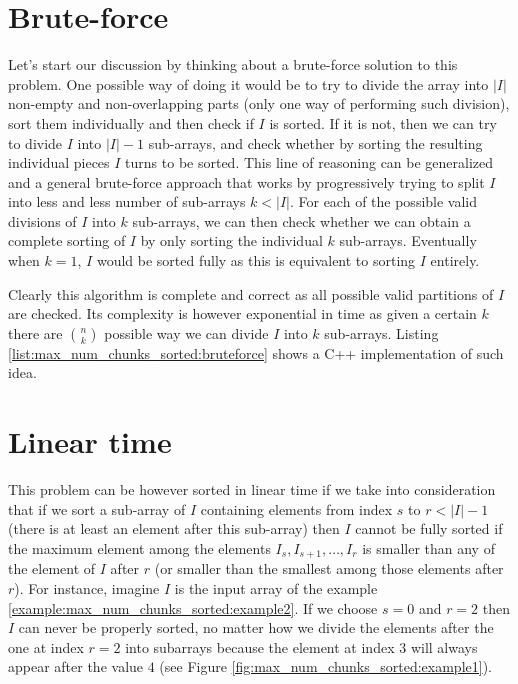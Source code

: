 \section{Brute-force}
\label{max_num_chunks_sorted:sec:bruteforce}


Let's start our discussion by thinking about a brute-force solution to this problem. 
One possible way of doing it would be to try to divide the array into $|I|$ non-empty and non-overlapping parts (only one way of performing such division), 
sort  them individually and then check if $I$ is sorted. 
If it is not, then we can try to divide $I$ into $|I|-1$ sub-arrays,
and check whether by sorting the resulting individual pieces $I$ turns to be sorted.
This line of reasoning can be generalized and a general brute-force approach
that works by progressively trying to split $I$ into less and less number of sub-arrays $k <|I|$.
For each of the possible valid divisions of $I$ into $k$ sub-arrays, we can then check whether we can obtain a complete sorting of $I$ by only sorting the individual $k$ sub-arrays.
Eventually when $k=1$, $I$ would be sorted fully as this is equivalent to sorting $I$ entirely.

Clearly this algorithm is complete and correct
as all possible valid partitions of $I$ are checked. Its complexity is however exponential
in time as given a certain $k$ there are ${n \choose k} $ possible way we can divide $I$ into $k$ sub-arrays. 
Listing \ref{list:max_num_chunks_sorted:bruteforce} shows a C++ implementation of such idea. 



    



\section{Linear time}
\label{max_num_chunks_sorted:sec:lineartime}
This problem can be however sorted in linear time if we take into consideration that if we sort a sub-array of $I$
containing elements from index $s$ to $r< |I|-1$  (there is at least an element after this sub-array) 
then $I$ cannot be fully sorted if the maximum element among the elements $I_s, I_{s+1},\ldots, I_r$
is smaller than any of the element of $I$ after $r$ (or smaller than the smallest among those elements after $r$). 
For instance, imagine $I$ is the input array of the example \ref{example:max_num_chunks_sorted:example2}. 
If we choose $s=0$ and $r=2$ then $I$ can never be properly sorted, no matter how we divide the elements after the one at index $r=2$ into subarrays
because the element at index $3$ will always appear after the value $4$ (see Figure \ref{fig:max_num_chunks_sorted:example1}).

